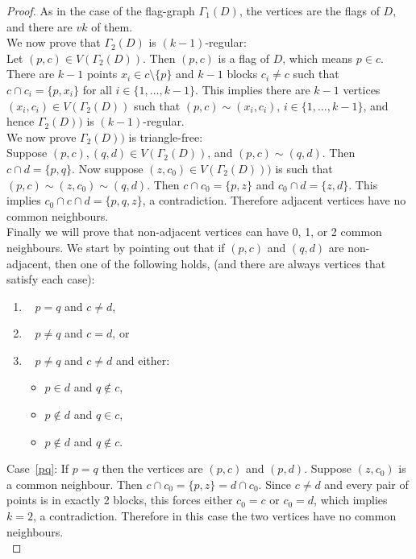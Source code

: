 \documentclass[letterpaper,10pt]{article}
\theoremstyle{plain}
\theoremstyle{definition}
\begin{document}
\begin{proof}
    As in the case of the flag-graph $\Gamma_1(D)$, the vertices are the flags of $D$, and there are $vk$ of them.\\

    We now prove that $\Gamma_2(D)$ is $(k-1)$-regular:\\
    Let $(p,c)\in V(\Gamma_2(D))$. Then $(p,c)$ is a flag of $D$, which means $p\in c$. There are $k-1$ points $x_i\in c\setminus\{p\}$ and $k-1$ blocks $c_i\neq c$ such that $c\cap c_i=\{p,x_i\}$ for all $i\in\{1,\ldots,k-1\}$. This implies there are $k-1$ vertices $(x_i,c_i)\in V(\Gamma_2(D))$ such that $(p,c)\sim(x_i,c_i)$, $i\in\{1,\ldots,k-1\}$, and hence $\Gamma_2(D))$ is $(k-1)$-regular.\\

    We now prove $\Gamma_2(D))$ is triangle-free:\\
    Suppose $(p,c),(q,d)\in V(\Gamma_2(D))$, and $(p,c)\sim(q,d)$. Then $c\cap d=\{p,q\}$. Now suppose $(z,c_0)\in V(\Gamma_2(D)))$ is such that $(p,c)\sim(z,c_0)\sim(q,d)$. Then $c\cap c_0=\{p,z\}$ and $c_0\cap d=\{z,d\}$. This implies $c_0\cap c\cap d=\{p,q,z\}$, a contradiction. Therefore adjacent vertices have no common neighbours.\\

    Finally we will prove that non-adjacent vertices can have 0, 1, or 2 common neighbours. We start by pointing out that if $(p,c)$ and $(q,d)$ are non-adjacent, then one of the following holds, (and there are always vertices that satisfy each case):
    \begin{enumerate}
        \item~\label{pq} $p=q$ and $c\neq d$,
        \item~\label{cd} $p\neq q$ and $c=d$, or
        \item~\label{nope} $p\neq q$ and $c\neq d$ and either:
        \begin{itemize}
            \item $p\in d$ and $q\notin c$,
            \item $p\notin d$ and $q\in c$,
            \item $p\notin d$ and $q\notin c$.
        \end{itemize}
    \end{enumerate}

    Case~\ref{pq}: If $p=q$ then the vertices are $(p,c)$ and $(p,d)$. Suppose $(z,c_0)$ is a common neighbour. Then $c\cap c_0=\{p,z\}=d\cap c_0$. Since $c\neq d$ and every pair of points is in exactly 2 blocks, this forces either $c_0=c$ or $c_0=d$, which implies $k=2$, a contradiction. Therefore in this case the two vertices have no common neighbours.\\


\end{proof}
\end{document}
